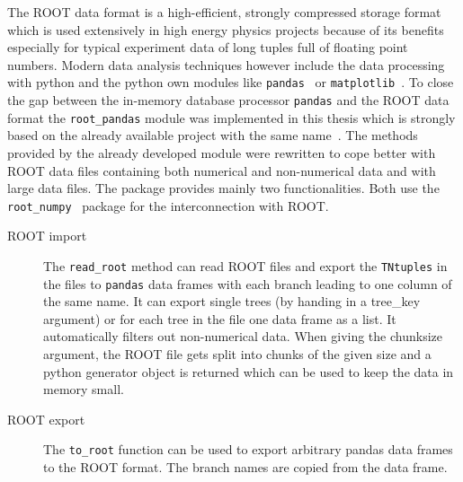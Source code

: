 The ROOT data format is a high-efficient, strongly compressed storage format which is used extensively in high energy physics projects because of its benefits especially for typical experiment data of long tuples full of floating point numbers. Modern data analysis techniques however include the data processing with python and the python own modules like \texttt{pandas}~\cite{pandas} or \texttt{matplotlib}~\cite{matplotlib}. To close the gap between the in-memory database processor \texttt{pandas} and the ROOT data format the \texttt{root\_pandas} module was implemented in this thesis which is strongly based on the already available project with the same name~\cite{root-pandas}. The methods provided by the already developed module were rewritten to cope better with ROOT data files containing both numerical and non-numerical data and with large data files. The package provides mainly two functionalities. Both use the \texttt{root\_numpy}~\cite{root-numpy} package for the interconnection with ROOT.

\begin{description}
 \item[ROOT import] The \verb+read_root+ method can read ROOT files and export the \texttt{TNtuples} in the files to \texttt{pandas} data frames with each branch leading to one column of the same name. It can export single trees (by handing in a tree\_key argument) or for each tree in the file one data frame as a list. It automatically filters out non-numerical data. When giving the chunksize argument, the ROOT file gets split into chunks of the given size and a python generator object is returned which can be used to keep the data in memory small.
 \item[ROOT export] The \verb+to_root+ function can be used to export arbitrary pandas data frames to the ROOT format. The branch names are copied from the data frame.
\end{description}
